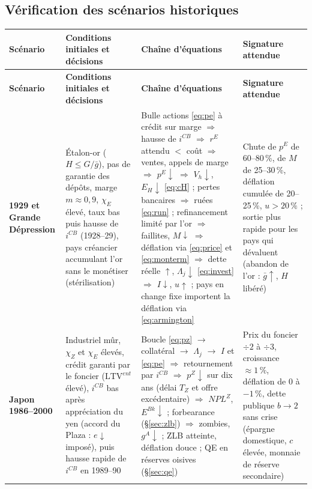 \documentclass[11pt,a4paper]{article}
\begin{document}
\subsection{Vérification des scénarios historiques}
\begin{center}\small
\begin{longtable}{p{2.2cm}p{4.0cm}p{5.7cm}p{3.0cm}}
\toprule
\textbf{Scénario} & \textbf{Conditions initiales et décisions} & \textbf{Chaîne d'équations} & \textbf{Signature attendue}\\
\midrule
\endfirsthead
\toprule
\textbf{Scénario} & \textbf{Conditions initiales et décisions} & \textbf{Chaîne d'équations} & \textbf{Signature attendue}\\
\midrule
\endhead
\textbf{1929 et Grande Dépression} & Étalon-or ($H \le G/\bar g$), pas de garantie des dépôts, marge $m \approx 0{,}9$, $\chi_E$ élevé, taux bas puis hausse de $i^{CB}$ (1928--29), pays créancier accumulant l'or sans le monétiser (stérilisation) & Bulle actions \eqref{eq:pe} à crédit sur marge $\Rightarrow$ hausse de $i^{CB}$ $\Rightarrow$ $r^E$ attendu $<$ coût $\Rightarrow$ ventes, appels de marge $\Rightarrow$ $p^E \downarrow$ $\Rightarrow$ $V_h \downarrow$, $E_H \downarrow$ \eqref{eq:cH} ; pertes bancaires $\Rightarrow$ ruées \eqref{eq:run} ; refinancement limité par l'or $\Rightarrow$ faillites, $M \downarrow$ $\Rightarrow$ déflation via \eqref{eq:price} et \eqref{eq:monterm} $\Rightarrow$ dette réelle $\uparrow$, $\Lambda_j \downarrow$ \eqref{eq:invest} $\Rightarrow$ $I \downarrow$, $u \uparrow$ ; pays en change fixe importent la déflation via \eqref{eq:armington} & Chute de $p^E$ de 60--80\,\%, de $M$ de 25--30\,\%, déflation cumulée de 20--25\,\%, $u > 20\,\%$ ; sortie plus rapide pour les pays qui dévaluent (abandon de l'or : $\bar g \uparrow$, $H$ libéré)\\
\midrule
\textbf{Japon 1986--2000} & Industriel mûr, $\chi_Z$ et $\chi_E$ élevés, crédit garanti par le foncier ($\mathrm{LTV}^{ent}$ élevé), $i^{CB}$ bas après appréciation du yen (accord du Plaza : $e \downarrow$ imposé), puis hausse rapide de $i^{CB}$ en 1989--90 & Boucle \eqref{eq:pz} $\to$ collatéral $\to$ $\Lambda_j$ $\to$ $I$ et \eqref{eq:pe} $\Rightarrow$ retournement par $i^{CB}$ $\Rightarrow$ $p^Z \downarrow$ sur dix ans (délai $T_Z$ et offre excédentaire) $\Rightarrow$ $NPL^Z$, $E^{Bk} \downarrow$ ; forbearance (\S\ref{sec:zlb}) $\Rightarrow$ zombies, $g^A \downarrow$ ; ZLB atteinte, déflation douce ; QE en réserves oisives (\S\ref{sec:qe}) & Prix du foncier $\div 2$ à $\div 3$, croissance $\approx 1\,\%$, déflation de 0 à $-1\,\%$, dette publique $b \to 2$ sans crise (épargne domestique, $c$ élevée, monnaie de réserve secondaire)\\

\end{longtable}
\end{center}
\end{document}
